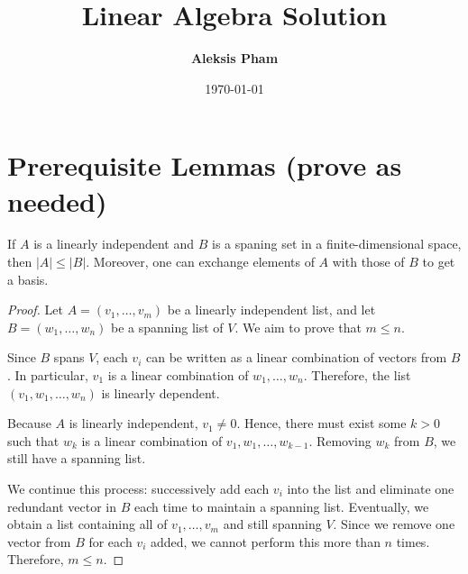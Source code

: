 \documentclass[11pt]{article}
\title{\textbf{Linear Algebra Solution}}
\author{\textbf{Aleksis Pham} }
\date{\today}
\begin{document}
\maketitle

\section*{Prerequisite Lemmas (prove as needed)}
\begin{boxedlemma}\label{lem:steinitz}
If $A$ is a linearly independent and $B$ is a spaning set  in a finite-dimensional space, then $|A|\le |B|$. Moreover, one can exchange elements of $A$ with those of $B$ to get a basis.
\end{boxedlemma}
\begin{proof}
    Let $A = (v_1, \dots, v_m)$ be a linearly independent list, and let $B = (w_1, \dots, w_n)$ be a spanning list of $V$. We aim to prove that $m \leq n$.

 Since $B$ spans $V$, each $v_i$ can be written as a linear combination of vectors from $B$. In particular, $v_1$ is a linear combination of $w_1, \dots, w_n$. Therefore, the list $(v_1, w_1, \dots, w_n)$ is linearly dependent.
 
 Because $A$ is linearly independent, $v_1 \neq 0$. Hence, there must exist some $k > 0$ such that $w_k$ is a linear combination of $v_1, w_1, \dots, w_{k-1}$. Removing $w_k$ from $B$, we still have a spanning list.
 
 We continue this process: successively add each $v_i$ into the list and eliminate one redundant vector in $B$ each time to maintain a spanning list. Eventually, we obtain a list containing all of $v_1, \dots, v_m$ and still spanning $V$. Since we remove one vector from $B$ for each $v_i$ added, we cannot perform this more than $n$ times. Therefore, $m \leq n$.
\end{proof}
\end{document}
